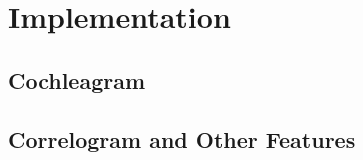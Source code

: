 \chapter{Implementation}\label{chapter:implementation}

\section{Cochleagram}
\section{Correlogram and Other Features}
